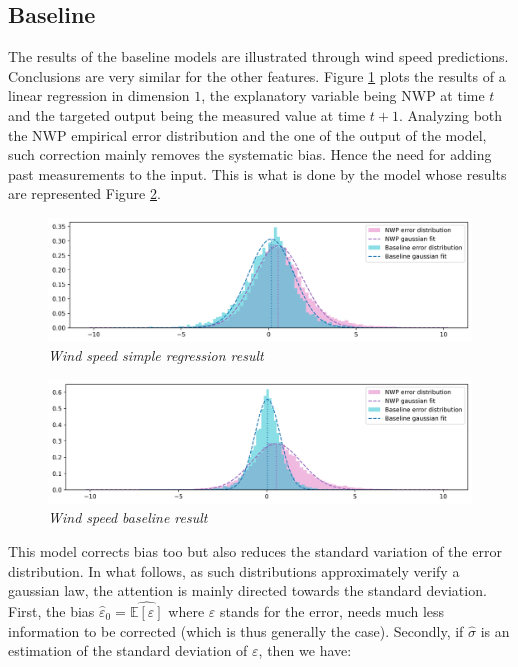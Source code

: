 \documentclass{article}
\begin{document}
\subsection*{Baseline}

The results of the baseline models are illustrated through wind speed predictions. Conclusions are very similar
for the other features. Figure \ref{fig:Fig. 4} plots the results of a linear regression in dimension $1$, the explanatory
variable being NWP at time $t$ and the targeted output being the measured value at time $t + 1$. Analyzing both
the NWP empirical error distribution and the one of the
output of the model, such correction mainly removes the systematic bias.
Hence the need for adding past measurements to the input. This is what is done by the model whose results
are represented Figure \ref{fig:Fig. 5}.


\begin{figure}[H]
    \centering
    \includegraphics[width=\linewidth]{img/base.png}
    \caption{\textit{Wind speed simple regression result}}
    \label{fig:Fig. 4}
\end{figure}

\begin{figure}[H]
    \centering
    \includegraphics[width=\linewidth]{img/baseline.png}
    \caption{\textit{Wind speed baseline result}}
    \label{fig:Fig. 5}
\end{figure}

This model corrects bias too but also reduces the standard variation of the error distribution. In what follows,
as such distributions approximately verify a gaussian law, the attention is mainly directed towards the standard
deviation. First, the bias $\hat \varepsilon_0 = \widehat{\mathbb E [ \varepsilon ]}$
where $\varepsilon$ stands for the error,
needs much less information to be corrected (which is thus generally the case). Secondly, if $\hat \sigma$ is an estimation
of the standard deviation of $\varepsilon$, then we have:
\end{document}
